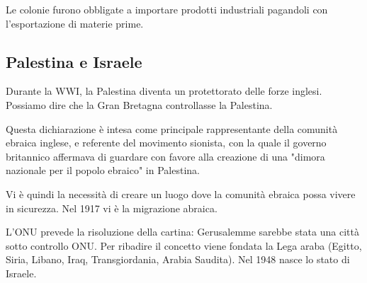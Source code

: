 \documentclass[a4paper]{article}
\begin{document}
Le colonie furono obbligate a importare prodotti industriali
pagandoli con l'esportazione di materie prime.


\subsection{Palestina e Israele}

Durante la WWI, la Palestina diventa un protettorato delle forze inglesi.
Possiamo dire che la Gran Bretagna controllasse la Palestina.


Questa dichiarazione è intesa come principale rappresentante della
comunità ebraica inglese, e referente del movimento
sionista, con la quale il governo britannico affermava di guardare
con favore alla creazione di una "dimora nazionale per il popolo ebraico" in Palestina.


Vi è quindi la necessità di creare un luogo dove la comunità ebraica possa vivere in sicurezza.
Nel 1917 vi è la migrazione abraica.

L'ONU prevede la risoluzione della cartina:
Gerusalemme sarebbe stata una città sotto controllo ONU.
Per ribadire il concetto viene fondata la Lega araba
(Egitto, Siria, Libano, Iraq, Transgiordania, Arabia Saudita).
Nel 1948 nasce lo stato di Israele. 


\end{document}

